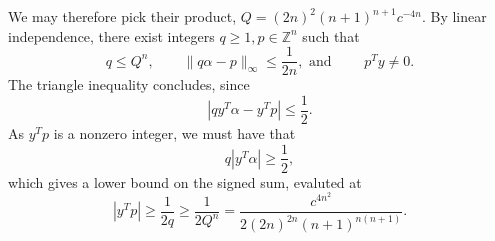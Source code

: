 \documentclass[12pt,a4paper]{article}
\theoremstyle{plain}
\theoremstyle{definition}
\def \Z {\mathbb Z}
\begin{document}
{\begin{enumerate}[i)]
		We may therefore pick their product, $Q = (2n)^2 (n+1)^{n+1} c^{-4n}$.
		By linear independence, there exist integers $q \geq 1, p \in \Z^n$ such that
			\[ q \leq Q^n, \qquad \|q\alpha - p \|_\infty \leq \frac{1}{2n},  \text{ and } \qquad p^T y \neq 0. \]
		The triangle inequality concludes, since
			\[ | q y^T \alpha - y^T p | \leq \frac12. \]
		As $y^Tp$ is a nonzero integer, we must have that
			\[ q | y^T \alpha | \geq \frac12, \]
		which gives a lower bound on the signed sum, evaluted at
			\[ | y^T p | \geq \frac{1}{2q} \geq \frac{1}{2Q^n} = \frac{c^{4n^2}}{2 (2n)^{2n}  (n+1)^{n(n+1)}}. \]

	\end{enumerate}
}
\end{document}
